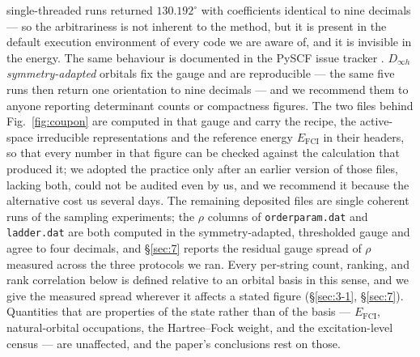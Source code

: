 \documentclass[onecolumn,a4paper]{quantumarticle}
\begin{document}
single-threaded runs returned $130.192^\circ$ with coefficients identical to nine decimals --- so the arbitrariness is not inherent to the method, but it is present in the default execution environment of every code we are aware of, and it is invisible in the energy. The same behaviour is documented in the PySCF issue tracker \cite{pyscf_degen}. \emph{$D_{\infty h}$ symmetry-adapted} orbitals fix the gauge and are reproducible --- the same five runs then return one orientation to nine decimals --- and we recommend them to anyone reporting determinant counts or compactness figures. The two files behind Fig.~\ref{fig:coupon} are computed in that gauge and carry the recipe, the active-space irreducible representations and the reference energy $E_{\mathrm{FCI}}$ in their headers, so that every number in that figure can be checked against the calculation that produced it; we adopted the practice only after an earlier version of those files, lacking both, could not be audited even by us, and we recommend it because the alternative cost us several days. The remaining deposited files are single coherent runs of the sampling experiments; the $\rho$ columns of \texttt{orderparam.dat} and \texttt{ladder.dat} are both computed in the symmetry-adapted, thresholded gauge and agree to four decimals, and \S\ref{sec:7} reports the residual gauge spread of $\rho$ measured across the three protocols we ran. Every per-string count, ranking, and rank correlation below is defined relative to an orbital basis in this sense, and we give the measured spread wherever it affects a stated figure (\S\ref{sec:3-1}, \S\ref{sec:7}). Quantities that are properties of the state rather than of the basis --- $E_{\mathrm{FCI}}$, natural-orbital occupations, the Hartree--Fock weight, and the excitation-level census --- are unaffected, and the paper's conclusions rest on those.
\end{document}
